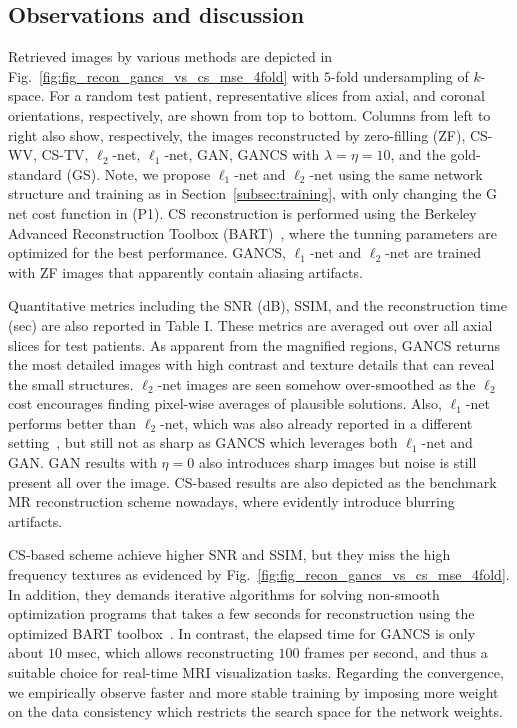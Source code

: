 \documentclass{journal}
\begin{document}



\subsection{Observations and discussion}
\label{subsec:obs}
%
Retrieved images by various methods are depicted in Fig.~\ref{fig:fig_recon_gancs_vs_cs_mse_4fold} with $5$-fold undersampling of $k$-space. For a random test patient, representative slices from axial, and coronal orientations, respectively, are shown from top to bottom. Columns from left to right also show, respectively, the images reconstructed by zero-filling (ZF), CS-WV, CS-TV, $\ell_2$-net, $\ell_1$-net, GAN, GANCS with $\lambda=\eta=10$, and the gold-standard (GS). Note, we propose $\ell_1$-net and $\ell_2$-net using the same network structure and training as in Section~\ref{subsec:training}, with only changing the G net cost function in (P1). CS reconstruction is performed using the Berkeley Advanced Reconstruction Toolbox (BART)~\cite{bart2016}, where the tunning parameters are optimized for the best performance. GANCS, $\ell_1$-net and $\ell_2$-net are trained with ZF images that apparently contain aliasing artifacts. 




Quantitative metrics including the SNR (dB), SSIM, and the reconstruction time (sec) are also reported in Table I. These metrics are averaged out over all axial slices for test patients. As apparent from the magnified regions, GANCS returns the most detailed images with high contrast and texture details that can reveal the small structures. $\ell_2$-net images are seen somehow over-smoothed as the $\ell_2$ cost encourages finding pixel-wise averages of plausible solutions. Also, $\ell_1$-net performs better than $\ell_2$-net, which was also already reported in a different setting~\cite{lossfunction_zhao2017}, but still not as sharp as GANCS which leverages both $\ell_1$-net and GAN. GAN results with $\eta=0$ also introduces sharp images but noise is still present all over the image. CS-based results are also depicted as the benchmark MR reconstruction scheme nowadays, where evidently introduce blurring artifacts. 


CS-based scheme achieve higher SNR and SSIM, but they miss the high frequency textures as evidenced by Fig.~\ref{fig:fig_recon_gancs_vs_cs_mse_4fold}. In addition, they demands iterative algorithms for solving non-smooth optimization programs that takes a few seconds for reconstruction using the optimized BART toolbox~\cite{bart2016}. In contrast, the elapsed time for GANCS is only about $10$ msec, which allows reconstructing $100$ frames per second, and thus a suitable choice for real-time MRI visualization tasks. Regarding the convergence, we empirically observe faster and more stable training by imposing more weight on the data consistency which restricts the search space for the network weights. 
\end{document}
